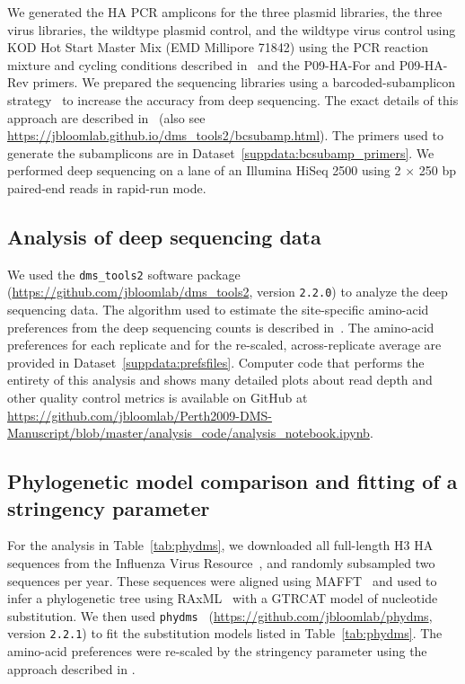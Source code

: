 \documentclass[9pt,twocolumn,twoside]{pnas-new-for-biorxiv}
\begin{document}
{We generated the HA PCR amplicons for the three plasmid libraries, the three virus libraries, the wildtype plasmid control, and the wildtype virus control using KOD Hot Start Master Mix (EMD Millipore 71842) using the PCR reaction mixture and cycling conditions described in~\cite{bloom2014experimentally} and the P09-HA-For and P09-HA-Rev primers.
We prepared the sequencing libraries using a barcoded-subamplicon strategy~\cite{wu2014high} to increase the accuracy from deep sequencing.
The exact details of this approach are described in~\cite{doud2016accurate} (also see \url{https://jbloomlab.github.io/dms_tools2/bcsubamp.html}).
The primers used to generate the subamplicons are in Dataset~\ref{suppdata:bcsubamp_primers}.
We performed deep sequencing on a lane of an Illumina HiSeq 2500 using 2 $\times$ 250 bp paired-end reads in rapid-run mode.

\subsection*{Analysis of deep sequencing data}
We used the \texttt{dms\_tools2} software package~\cite{bloom2015software} (\url{https://github.com/jbloomlab/dms_tools2}, version \texttt{2.2.0}) to analyze the deep sequencing data.
The algorithm used to estimate the site-specific amino-acid preferences from the deep sequencing counts is described in~\cite{bloom2015software}.
The amino-acid preferences for each replicate and for the re-scaled, across-replicate average are provided in Dataset~\ref{suppdata:prefsfiles}.
Computer code that performs the entirety of this analysis and shows many detailed plots about read depth and other quality control metrics is available on GitHub at \url{https://github.com/jbloomlab/Perth2009-DMS-Manuscript/blob/master/analysis_code/analysis_notebook.ipynb}.

\subsection*{Phylogenetic model comparison and fitting of a stringency parameter}
For the analysis in Table~\ref{tab:phydms}, we downloaded all full-length H3 HA sequences from the Influenza Virus Resource~\cite{bao2008}, and randomly subsampled two sequences per year.
These sequences were aligned using MAFFT~\cite{katoh2013mafft} and used to infer a phylogenetic tree using RAxML~\cite{stamatakis2006raxml} with a GTRCAT model of nucleotide substitution.
We then used \texttt{phydms}~\cite{hilton2017phydms} (\url{https://github.com/jbloomlab/phydms}, version \texttt{2.2.1}) to fit the substitution models listed in Table~\ref{tab:phydms}.
The amino-acid preferences were re-scaled by the stringency parameter using the approach described in \cite{hilton2017phydms}.

}
\end{document}
